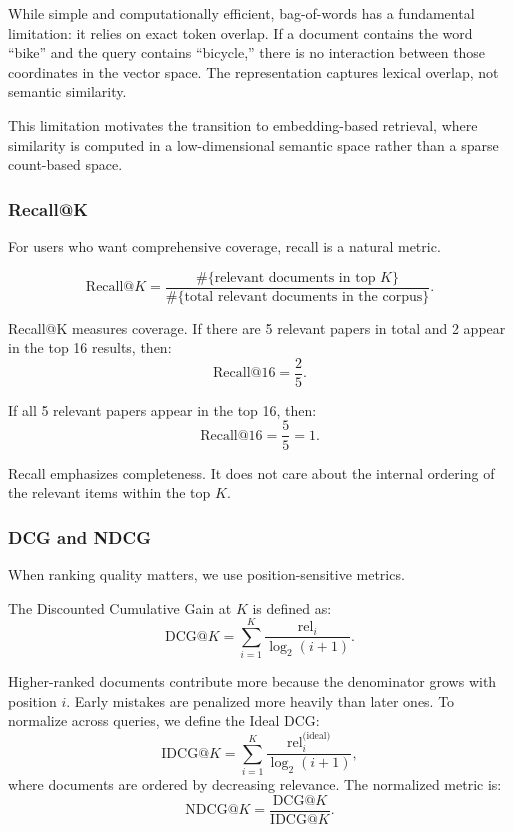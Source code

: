 While simple and computationally efficient, bag-of-words has a fundamental limitation: it relies on exact token overlap. If a document contains the word ``bike'' and the query contains ``bicycle,'' there is no interaction between those coordinates in the vector space. The representation captures lexical overlap, not semantic similarity.

This limitation motivates the transition to embedding-based retrieval, where similarity is computed in a low-dimensional semantic space rather than a sparse count-based space.

\bigskip

\subsubsection{Recall@K}

\medskip

For users who want comprehensive coverage, recall is a natural metric.

\[
\text{Recall@}K
=
\frac{\# \{\text{relevant documents in top } K\}}
{\# \{\text{total relevant documents in the corpus}\}}.
\]

Recall@K measures coverage. If there are 5 relevant papers in total and 2 appear in the top 16 results, then:
\[
\text{Recall@16} = \frac{2}{5}.
\]

If all 5 relevant papers appear in the top 16, then:
\[
\text{Recall@16} = \frac{5}{5} = 1.
\]

Recall emphasizes completeness. It does not care about the internal ordering of the relevant items within the top $K$.

\bigskip

\subsubsection{DCG and NDCG}

\medskip

When ranking quality matters, we use position-sensitive metrics.

The Discounted Cumulative Gain at $K$ is defined as:
\[
\text{DCG@}K
=
\sum_{i=1}^{K}
\frac{\text{rel}_i}{\log_2(i+1)}.
\]

Higher-ranked documents contribute more because the denominator grows with position $i$. Early mistakes are penalized more heavily than later ones. To normalize across queries, we define the Ideal DCG:
\[
\text{IDCG@}K
=
\sum_{i=1}^{K}
\frac{\text{rel}_i^{\text{(ideal)}}}{\log_2(i+1)},
\]
where documents are ordered by decreasing relevance. The normalized metric is:
\[
\text{NDCG@}K
=
\frac{\text{DCG@}K}{\text{IDCG@}K}.
\]


